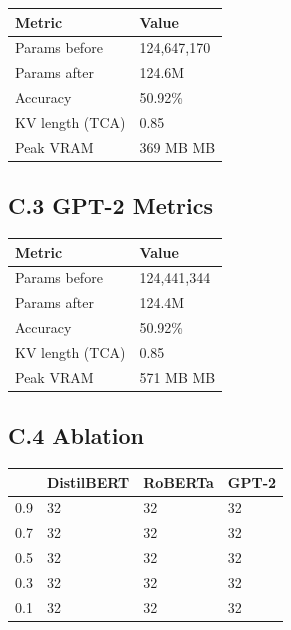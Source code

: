 \begin{table}[H]
\centering
\small
\begin{tabular}{ll}
\toprule
\textbf{Metric} & \textbf{Value} \\
\midrule
Params before & 124,647,170 \\
Params after & 124.6M \\
Accuracy & 50.92\% \\
KV length (TCA) & 0.85 \\
Peak VRAM & 369 MB MB \\
\bottomrule
\end{tabular}
\end{table}

\subsection{C.3 GPT-2 Metrics}

\begin{table}[H]
\centering
\small
\begin{tabular}{ll}
\toprule
\textbf{Metric} & \textbf{Value} \\
\midrule
Params before & 124,441,344 \\
Params after & 124.4M \\
Accuracy & 50.92\% \\
KV length (TCA) & 0.85 \\
Peak VRAM & 571 MB MB \\
\bottomrule
\end{tabular}
\end{table}

\subsection{C.4   Ablation}

\begin{table}[H]
\centering
\small
\begin{tabular}{llll}
\toprule
\textbf{} & \textbf{DistilBERT} & \textbf{RoBERTa} & \textbf{GPT-2} \\
\midrule
0.9 & 32 & 32 & 32 \\
0.7 & 32 & 32 & 32 \\
0.5 & 32 & 32 & 32 \\
0.3 & 32 & 32 & 32 \\
0.1 & 32 & 32 & 32 \\
\bottomrule
\end{tabular}
\end{table}

